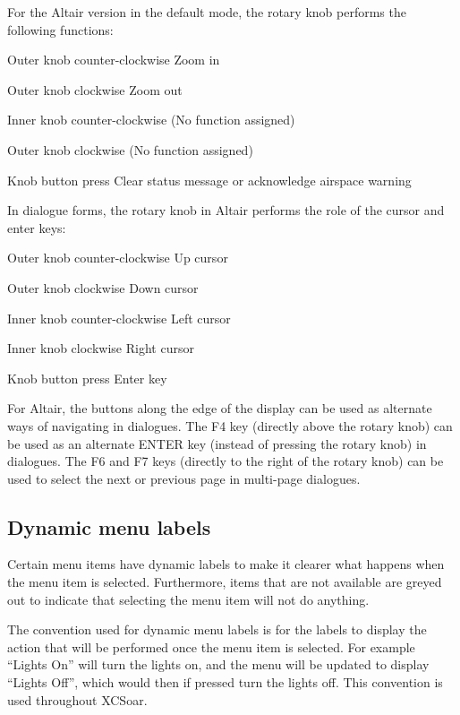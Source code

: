 For the Altair version in the default mode, the rotary knob performs
the following functions:
\begin{jspecs}
\item[Outer knob counter-clockwise] Zoom in
\item[Outer knob clockwise] Zoom out
\item[Inner knob counter-clockwise] (No function assigned)
\item[Outer knob clockwise] (No function assigned)
\item[Knob button press] Clear status message or acknowledge airspace warning
\end{jspecs}

In dialogue forms, the rotary knob in Altair performs the role of the cursor and
enter keys:
\begin{jspecs}
\item[Outer knob counter-clockwise] Up cursor
\item[Outer knob clockwise] Down cursor
\item[Inner knob counter-clockwise] Left cursor
\item[Inner knob clockwise] Right cursor
\item[Knob button press] Enter key
\end{jspecs}

For Altair, the buttons along the edge of the display can be used as
alternate ways of navigating in dialogues.  The F4 key (directly above
the rotary knob) can be used as an alternate ENTER key (instead of
pressing the rotary knob) in dialogues.  The F6 and F7 keys (directly to
the right of the rotary knob) can be used to select the next or
previous page in multi-page dialogues.

\subsection*{Dynamic menu labels}
Certain menu items have dynamic labels to make it clearer what happens when the
menu item is selected.  Furthermore, items that are not available are greyed
out to indicate that selecting the menu item will not do anything.

The convention used for dynamic menu labels is for the labels to display the
action that will be performed once the menu item is selected. For example 
``Lights On'' will turn the lights on, and the menu will be updated to display
``Lights Off'', which would then if pressed turn the lights off. This
convention is used throughout XCSoar.

